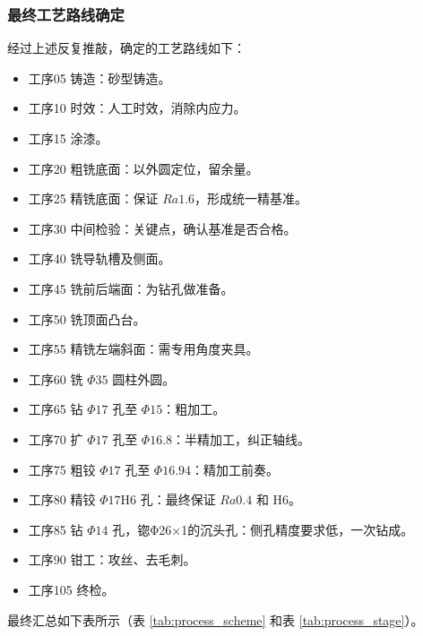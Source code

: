 \documentclass[withoutpreface,bwprint]{cumcmthesis}
\begin{document}
\subsubsection{最终工艺路线确定}
经过上述反复推敲，确定的工艺路线如下：
\begin{itemize}
    \item 工序05 铸造：砂型铸造。
    \item 工序10 时效：人工时效，消除内应力。
    \item 工序15 涂漆。
    \item 工序20 粗铣底面：以外圆定位，留余量。
    \item 工序25 精铣底面：保证 $Ra 1.6$，形成统一精基准。
    \item 工序30 中间检验：关键点，确认基准是否合格。
    \item 工序40 铣导轨槽及侧面。
    \item 工序45 铣前后端面：为钻孔做准备。
    \item 工序50 铣顶面凸台。
    \item 工序55 精铣左端斜面：需专用角度夹具。
    \item 工序60 铣 $\Phi35$ 圆柱外圆。
    \item 工序65 钻 $\Phi17$ 孔至 $\Phi15$：粗加工。
    \item 工序70 扩 $\Phi17$ 孔至 $\Phi16.8$：半精加工，纠正轴线。
    \item 工序75 粗铰 $\Phi17$ 孔至 $\Phi16.94$：精加工前奏。
    \item 工序80 精铰 $\Phi17$H6 孔：最终保证 $Ra 0.4$ 和 H6。
    \item 工序85 钻 $\Phi14$ 孔，锪Φ26×1的沉头孔：侧孔精度要求低，一次钻成。
    \item 工序90 钳工：攻丝、去毛刺。
    \item 工序105 终检。
\end{itemize}

最终汇总如下表所示（表 \ref{tab:process_scheme} 和表 \ref{tab:process_stage}）。
\end{document}
